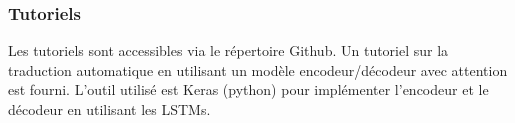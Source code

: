 \documentclass{KodeBook}
\begin{document}
\subsubsection*{Tutoriels}

Les tutoriels sont accessibles via le répertoire Github.
Un tutoriel sur la traduction automatique en utilisant un modèle encodeur/décodeur avec attention est fourni.
L'outil utilisé est Keras (python) pour implémenter l'encodeur et le décodeur en utilisant les LSTMs.




\ifx\wholebook\relax\else
% 
% 
	
\end{document}
